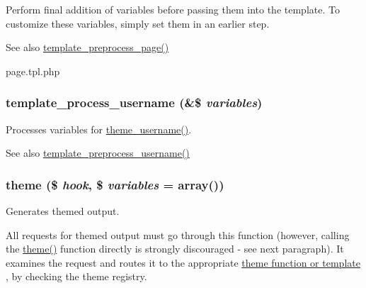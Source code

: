 Perform final addition of variables before passing them into the template. To customize these variables, simply set them in an earlier step.

\begin{DoxySeeAlso}{See also}
\hyperlink{includes_2theme_8inc_a128dae24f990d8ba4710ac78b0584c11}{template\_\-preprocess\_\-page()} 

page.tpl.php 
\end{DoxySeeAlso}
\hypertarget{includes_2theme_8inc_abc04f244a6775dd537c6dd2a7397060c}{
\subsubsection[{template\_\-process\_\-username}]{\setlength{\rightskip}{0pt plus 5cm}template\_\-process\_\-username (\&\$ {\em variables})}}
\label{includes_2theme_8inc_abc04f244a6775dd537c6dd2a7397060c}
Processes variables for \hyperlink{group__themeable_ga94b6d36f659ae6bf42e7971682cd24eb}{theme\_\-username()}.

\begin{DoxySeeAlso}{See also}
\hyperlink{includes_2theme_8inc_a102e6392077c4dc3810ec48fdf60fd8c}{template\_\-preprocess\_\-username()} 
\end{DoxySeeAlso}
\hypertarget{includes_2theme_8inc_a7c25609a935874541a19657affd30fff}{
\subsubsection[{theme}]{\setlength{\rightskip}{0pt plus 5cm}theme (\$ {\em hook}, \/  \$ {\em variables} = {\ttfamily array()})}}
\label{includes_2theme_8inc_a7c25609a935874541a19657affd30fff}
Generates themed output.

All requests for themed output must go through this function (however, calling the \hyperlink{includes_2theme_8inc_a7c25609a935874541a19657affd30fff}{theme()} function directly is strongly discouraged -\/ see next paragraph). It examines the request and routes it to the appropriate \hyperlink{group__themeable}{theme function or template }, by checking the theme registry.

